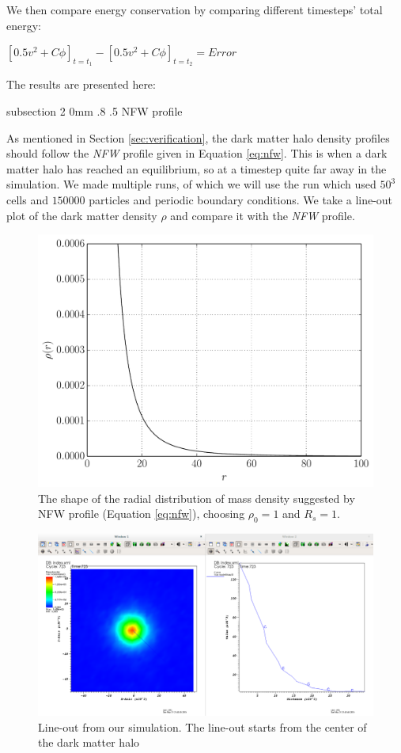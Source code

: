 \documentclass[notitlepage, 12pt]{article}
\makeatletter
\renewcommand{\subsection}{\@startsection    %
        {subsection}
        {2}
        {0mm}
        {.8\baselineskip}
        {.5\baselineskip}
        {\bfseries\normalsize}}
\makeatother
\begin{document}
We then compare energy conservation by comparing different timesteps' total energy:

$[0.5v^2+C\phi]_{t=t_1} - [0.5v^2+C\phi]_{t=t_2} = Error$

The results are presented here:



\subsection{NFW profile}

As mentioned in Section \ref{sec:verification}, the dark matter halo density profiles should follow the \emph{NFW} profile given in Equation \ref{eq:nfw}. 
This is when a dark matter halo has reached an equilibrium, so at a timestep quite far away in the simulation. We made multiple runs, of which we will use 
the run which used $50^3$ cells and $150000$ particles and periodic boundary conditions. We take a line-out plot of the dark matter density $\rho$ and 
compare it with the \emph{NFW} profile.

\begin{figure}[H]
\centering
\includegraphics[width=.8\textwidth]{NFW_profile.pdf}
\caption{The shape of the radial distribution of mass density suggested by NFW profile (Equation \ref{eq:nfw}), choosing $\rho_0=1$ and $R_s=1$.}
\label{fig:nfw}
\end{figure}

\begin{figure}[H]
\centering
\includegraphics[width=.8\textwidth]{NFW-profile.png}
\caption{Line-out from our simulation. The line-out starts from the center of the dark matter halo}
\label{fig:simulationnfw}
\end{figure}
\end{document}
